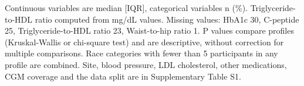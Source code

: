 \begin{table}[htbp]
\par\smallskip
\begin{minipage}{\linewidth}\scriptsize
Continuous variables are median [IQR], categorical variables n (\%). Triglyceride-to-HDL ratio computed from mg/dL values. Missing values: HbA1c 30, C-peptide 25, Triglyceride-to-HDL ratio 23, Waist-to-hip ratio 1. P values compare profiles (Kruskal-Wallis or chi-square test) and are descriptive, without correction for multiple comparisons. Race categories with fewer than 5 participants in any profile are combined. Site, blood pressure, LDL cholesterol, other medications, CGM coverage and the data split are in Supplementary Table S1.
\end{minipage}
\end{table}

